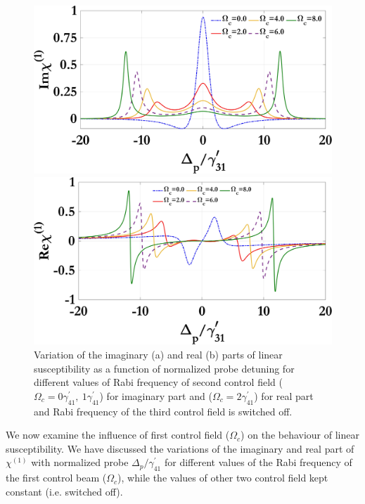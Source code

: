 \documentclass[a4paper,12pt]{article}
\begin{document}
\begin{figure}[ht]
  \centering
  \begin{minipage}{0.48\textwidth}
    \centering
    \includegraphics[width=\linewidth]{Plots/Img_chi1_Omega_c.jpeg}
    \subcaption{}
  \end{minipage}%
  \hfill
  \begin{minipage}{0.48\textwidth}
    \centering
    \includegraphics[width=\linewidth]{Plots/Real_chi1_Omega_c.jpeg}
    \subcaption{}
  \end{minipage}
  \caption{Variation of the imaginary (a) and real (b) parts of linear susceptibility as a function of normalized probe detuning for different values of Rabi frequency of second control field ($\Omega_c=0\gamma^{\prime}_{41},\ 1\gamma^{\prime}_{41}$) for imaginary part and ($\Omega_c=2\gamma^{\prime}_{41}$) for real part and Rabi frequency of the third control field is switched off.}
  \label{fig:chi1_omegac}
\end{figure}

We now examine the influence of first control field ($\Omega_{c}$) on the behaviour of linear susceptibility. We have discussed the variations of the imaginary and real part of $\chi^{(1)}$ with normalized probe $\Delta_{p}/\gamma^{\prime}_{41}$ for different values of the Rabi frequency of the first control beam ($\Omega_c$), while the values of other two control field kept constant (i.e. switched off).
\end{document}
